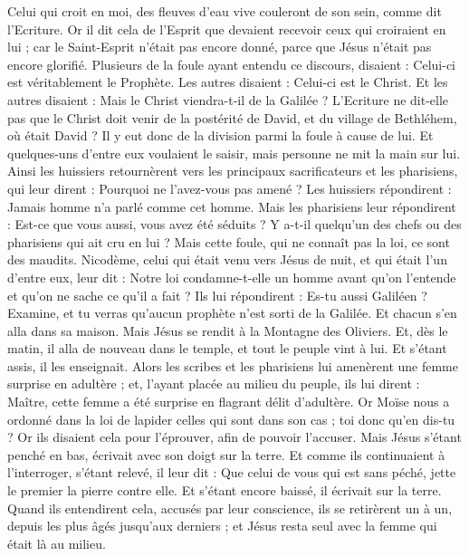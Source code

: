 \begin{multicols}{2}
Celui qui croit en moi, des fleuves d'eau vive couleront de son sein, comme dit l'Ecriture.
Or il dit cela de l'Esprit que devaient recevoir ceux qui croiraient en lui ; car le Saint-Esprit n'était pas encore donné, parce que Jésus n'était pas encore glorifié.
Plusieurs de la foule ayant entendu ce discours, disaient : Celui-ci est véritablement le Prophète.
Les autres disaient : Celui-ci est le Christ. Et les autres disaient : Mais le Christ viendra-t-il de la Galilée ?
L'Ecriture ne dit-elle pas que le Christ doit venir de la postérité de David, et du village de Bethléhem, où était David ?
Il y eut donc de la division parmi la foule à cause de lui.
Et quelques-uns d'entre eux voulaient le saisir, mais personne ne mit la main sur lui.
Ainsi les huissiers retournèrent vers les principaux sacrificateurs et les pharisiens, qui leur dirent : Pourquoi ne l'avez-vous pas amené ?
Les huissiers répondirent : Jamais homme n'a parlé comme cet homme.
Mais les pharisiens leur répondirent : Est-ce que vous aussi, vous avez été séduits ?
Y a-t-il quelqu'un des chefs ou des pharisiens qui ait cru en lui ?
Mais cette foule, qui ne connaît pas la loi, ce sont des maudits.
Nicodème, celui qui était venu vers Jésus de nuit, et qui était l'un d'entre eux, leur dit :
Notre loi condamne-t-elle un homme avant qu'on l'entende et qu'on ne sache ce qu'il a fait ?
Ils lui répondirent : Es-tu aussi Galiléen ? Examine, et tu verras qu'aucun prophète n'est sorti de la Galilée.
Et chacun s'en alla dans sa maison.
\VerseOne{}Mais Jésus se rendit à la Montagne des Oliviers.
Et, dès le matin, il alla de nouveau dans le temple, et tout le peuple vint à lui. Et s'étant assis, il les enseignait.
Alors les scribes et les pharisiens lui amenèrent une femme surprise en adultère ;
et, l'ayant placée au milieu du peuple, ils lui dirent : Maître, cette femme a été surprise en flagrant délit d'adultère.
Or Moïse nous a ordonné dans la loi de lapider celles qui sont dans son cas ; toi donc qu'en dis-tu ?
Or ils disaient cela pour l'éprouver, afin de pouvoir l'accuser. Mais Jésus s'étant penché en bas, écrivait avec son doigt sur la terre.
Et comme ils continuaient à l'interroger, s'étant relevé, il leur dit : Que celui de vous qui est sans péché, jette le premier la pierre contre elle.
Et s'étant encore baissé, il écrivait sur la terre.
Quand ils entendirent cela, accusés par leur conscience, ils se retirèrent un à un, depuis les plus âgés jusqu'aux derniers ; et Jésus resta seul avec la femme qui était là au milieu.

\end{multicols}
